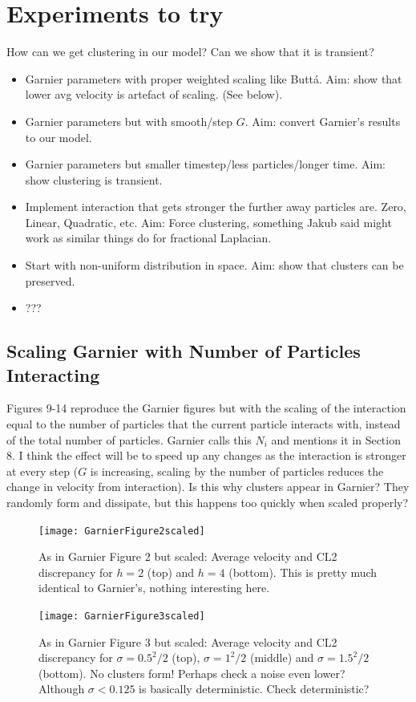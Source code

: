 \documentclass[11pt,a4paper, final, dvipsnames]{article}
\begin{document}
\section{Experiments to try}
    How can we get clustering in our model? Can we show that it is transient?
\begin{itemize}
    \item Garnier parameters with proper weighted scaling like Butt\'a. Aim: show that lower avg velocity is artefact of scaling. (See below).
    \item Garnier parameters but with smooth/step $G$. Aim: convert Garnier's results to our model.
    \item Garnier parameters but smaller timestep/less particles/longer time. Aim: show clustering is transient.
    \item Implement interaction that gets stronger the further away particles are. Zero, Linear, Quadratic, etc. Aim: Force clustering, something Jakub said might work as similar things do for fractional Laplacian.
    \item Start with non-uniform distribution in space. Aim: show that clusters can be preserved.
    \item ???
\end{itemize}

\subsection{Scaling Garnier with Number of Particles Interacting }
Figures 9-14 reproduce the Garnier figures but with the scaling of the interaction equal to the number of particles that the current particle interacts with, instead of the total number of particles. Garnier calls this $N_i$ and mentions it in Section 8. I think the effect will be to speed up any changes as the interaction is stronger at every step ($G$ is increasing, scaling by the number of particles reduces the change in velocity from interaction). Is this why clusters appear in Garnier? They randomly form and dissipate, but this happens too quickly when scaled properly?
\begin{figure}
    \centering
        \texttt{[image: GarnierFigure2scaled]}
    \caption{As in Garnier Figure 2 but scaled: Average velocity and CL2 discrepancy for $ h=2$ (top) and $h=4$ (bottom). This is pretty much identical to Garnier's, nothing interesting here. }
\end{figure}
\begin{figure}
    \centering
    \texttt{[image: GarnierFigure3scaled]}
    \caption{As in Garnier Figure 3 but scaled: Average velocity and CL2 discrepancy for $\sigma = 0.5^2/2$ (top), $\sigma = 1^2/2$ (middle) and $\sigma = 1.5^2/2$ (bottom). No clusters form! Perhaps check a noise even lower? Although $\sigma < 0.125$ is basically deterministic. Check deterministic?}
\end{figure}
\end{document}
